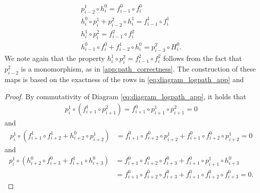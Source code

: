 \documentclass[11pt]{article}
\begin{document}
\begin{equation} \label{eq:map_properties}
\begin{aligned}
p_{i-2}^1\circ h^0_i=f^0_{i-1}\circ f^0_{i} \\
h^0_i\circ p^1_i + p^2_{i-2}\circ h^1_i = f^1_{i-1}\circ f^1_i \\ 
h^1_i\circ p_i^2=f^2_{i-1}\circ f^2_{i} \\
h^0_{i-1} \circ f^0_i + f^1_{i-2}\circ h^0_{i} =p^2_{i-3}\circ H_i^0 .
\end{aligned}
\end{equation}
We note again that the property $h^1_i\circ p_i^2=f^2_{i-1}\circ f^2_{i}$ follows from the fact that $p_{i-2}^2$ is a monomorphism, as in \ref{app:path_correctness}. The construction of these maps is based on the exactness of the rows in \eqref{eq:diagram_logpath_app} and
%
%
\begin{proof}%
    By commutativity of Diagram \ref{eq:diagram_logpath_app}, it holds that
    \begin{equation*}
     \begin{split}
          p^1_i\circ (f^1_{i+1}\circ p^2_{i+1})=f_{i+1}^0\circ p_{i+1}^1\circ p_{i+1}^2=0 
     \end{split}
    \end{equation*}
    and
    \begin{equation*}
     \begin{split}
            p^1_{i}\circ (f^1_{i+1}\circ f^1_{i+2} + h^0_{i+2}\circ p^1_{i+2}) & = f^0_{i+1}\circ f^0_{i+2} \circ p^1_{i+2} + f_{i+1}^0\circ f_{i+2}^0 \circ p^1_{i+2} = 0
    \end{split}
    \end{equation*}
    and
    \begin{equation*}
    \begin{split}
    p^1_{i}\circ(h^0_{i+2}\circ f^0_{i+3} + f^1_{i+1} \circ h^0_{i+3}) &= f_{i+1}^0\circ f_{i+2}^0\circ f_{i+3}^0+f_{i+1}^0\circ p_{i+1}^1\circ h_{i+3}^0 \\ & = f_{i+1}^0\circ f_{i+2}^0\circ f_{i+3}^0+f_{i+1}^0\circ f_{i+2}^0\circ f_{i+3}^0=0 .
    \end{split}
    \end{equation*}
\end{proof}
%
\end{document}
